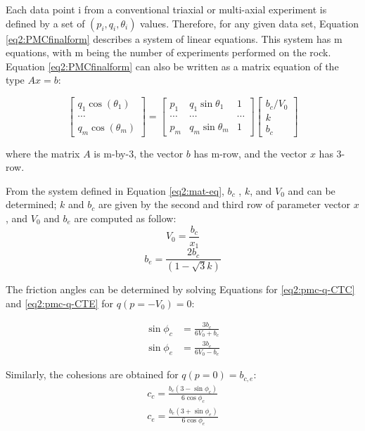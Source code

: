 Each data point i from a conventional triaxial or multi-axial experiment is defined by a set of $(p_i,q_i,\theta_i)$ values. Therefore, for any given data set, Equation \ref{eq2:PMCfinalform} describes a system of linear equations. This system has m equations, with m being the number of experiments performed on the rock. Equation \ref{eq2:PMCfinalform} can also be written as a matrix equation of the type $Ax=b$:

\begin{equation}\label{eq2:mat-eq}
    \left[\begin{array}{c}
    {q_{1} \cos \left(\theta_{1}\right)} \\
    {\cdots} \\
    {q_{m} \cos \left(\theta_{m}\right)}
    \end{array}\right]=\left[\begin{array}{ccc}
    {p_{1}} & {q_{1} \sin \theta_{1}} & {1} \\
    {\cdots} & {\cdots} & {\cdots} \\
    {p_{m}} & {q_{m} \sin \theta_{m}} & {1}
    \end{array}\right]\left[\begin{array}{c}
    {b_{c} / V_{0}} \\
    {k} \\
    {b_{c}}
    \end{array}\right]
\end{equation}

where the matrix $A$ is m-by-3, the vector $b$ has m-row, and the vector $x$ has 3-row. 

From the system defined in Equation \ref{eq2:mat-eq}, $b_c$ , $k$, and $V_0$  and can be determined; $k$ and $b_c$  are given by the second and third row of parameter vector $x$, and $V_0$ and $b_e$ are computed as follow: 
\begin{equation}\label{eq2:pmc_vo}
    V_0 = \frac{b_c}{x_1}
\end{equation}
\begin{equation}\label{eq2:pmc_be}
    b_e = \frac{2b_c}{(1-\sqrt{3}k)} 
\end{equation}

The friction angles can be determined by solving Equations for \ref{eq2:pmc-q-CTC} and \ref{eq2:pmc-q-CTE} for $q(p=-V_0)=0$:

\begin{align}\label{eq2:pmc_phi}
    \sin \phi_c &= \frac{3b_c}{6V_0+b_c} \\
    \sin \phi_e &= \frac{3b_e}{6V_0-b_e} 
\end{align}

Similarly, the cohesions are obtained for $q(p=0)=b_{c,e}$:
\begin{align}\label{eq2:pmc_c}
    c_{c} =\frac{b_{c}\left(3-\sin \phi_{c}\right)}{6 \cos \phi_{c}} \\
    c_{e} =\frac{b_{e}\left(3+\sin \phi_{e}\right)}{6 \cos \phi_{e}}
\end{align}